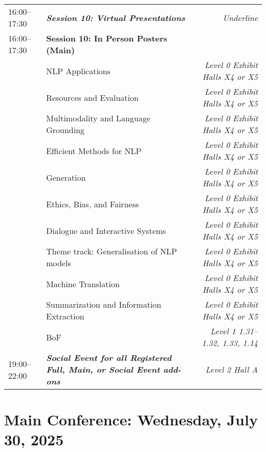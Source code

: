 \begin{xltabular}{\linewidth}{l X r}
    16:00--17:30    &   \textit{\textbf{Session 10: Virtual Presentations}}    & \textit{Underline}  \\
    16:00--17:30    &   \textbf{Session 10: In Person Posters (Main)} & \\
    &   NLP Applications  & \textit{Level 0 Exhibit Halls X4 or X5} \\
    &   Resources and Evaluation  & \textit{Level 0 Exhibit Halls X4 or X5} \\
    &   Multimodality and Language Grounding  & \textit{Level 0 Exhibit Halls X4 or X5} \\
    &   Efficient Methods for NLP  & \textit{Level 0 Exhibit Halls X4 or X5} \\
    &   Generation    & \textit{Level 0 Exhibit Halls X4 or X5} \\
    &   Ethics, Bias, and Fairness  & \textit{Level 0 Exhibit Halls X4 or X5} \\
    &   Dialogue and Interactive Systems  & \textit{Level 0 Exhibit Halls X4 or X5} \\
    &   Theme track: Generalisation of NLP models  & \textit{Level 0 Exhibit Halls X4 or X5} \\
    &   Machine Translation  & \textit{Level 0 Exhibit Halls X4 or X5} \\
    &   Summarization and Information Extraction  & \textit{Level 0 Exhibit Halls X4 or X5} \\
    &   BoF  & \textit{Level 1 1.31--1.32, 1.33, 1.14} \\

    19:00--22:00    &   \textit{\textbf{Social Event for all Registered Full, Main, or Social Event add-ons}}    &  \textit{Level 2 Hall A} \\


\end{xltabular}

\clearpage


\section{Main Conference: Wednesday, July 30, 2025}

